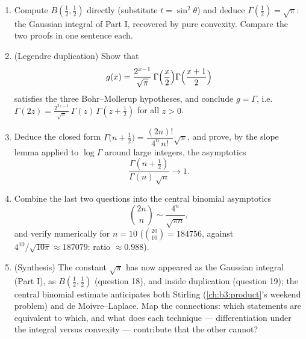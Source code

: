 \begin{problem}
\begin{enumerate}[resume]
  \item Compute $B(\frac12, \frac12)$ directly (substitute $t
        = \sin^2\theta$) and deduce $\Gamma(\frac12) =
        \sqrt\pi$: the Gaussian integral of Part I, recovered
        by pure convexity. Compare the two proofs in one
        sentence each.
  \item (Legendre duplication) Show that
        \[
        g(x) = \frac{2^{x-1}}{\sqrt\pi}\,
        \Gamma\Bigl(\frac x2\Bigr)
        \Gamma\Bigl(\frac{x+1}2\Bigr)
        \]
        satisfies the three Bohr--Mollerup hypotheses, and
        conclude $g = \Gamma$, i.e.\ $\Gamma(2z) =
        \frac{2^{2z-1}}{\sqrt\pi}\,\Gamma(z)\,\Gamma(z +
        \tfrac12)$ for all $z > 0$.
  \item Deduce the closed form $\Gamma\bigl(n + \tfrac12\bigr)
        = \dfrac{(2n)!}{4^n\,n!}\sqrt\pi$, and prove, by the
        slope lemma applied to $\log\Gamma$ around large
        integers, the asymptotics
        \[
        \frac{\Gamma(n + \frac12)}{\Gamma(n)\,\sqrt n}
        \longrightarrow 1 .
        \]
  \item Combine the last two questions into the central
        binomial asymptotics
        \[
        \binom{2n}{n} \sim \frac{4^n}{\sqrt{\pi n}},
        \]
        and verify numerically for $n = 10$ ($\binom{20}{10} =
        184756$, against $4^{10}/\sqrt{10\pi} \approx
        187079$: ratio $\approx 0.988$).
  \item (Synthesis) The constant $\sqrt\pi$ has now appeared as
        the Gaussian integral (Part I), as $B(\frac12,
        \frac12)$ (question 18), and inside duplication
        (question 19); the central binomial estimate
        anticipates both Stirling (\cref{ch:b3:product}'s
        weekend problem) and de Moivre--Laplace. Map the
        connections: which statements are equivalent to which,
        and what does each technique --- differentiation under
        the integral versus convexity --- contribute that the
        other cannot?
\end{enumerate}


\end{problem}
